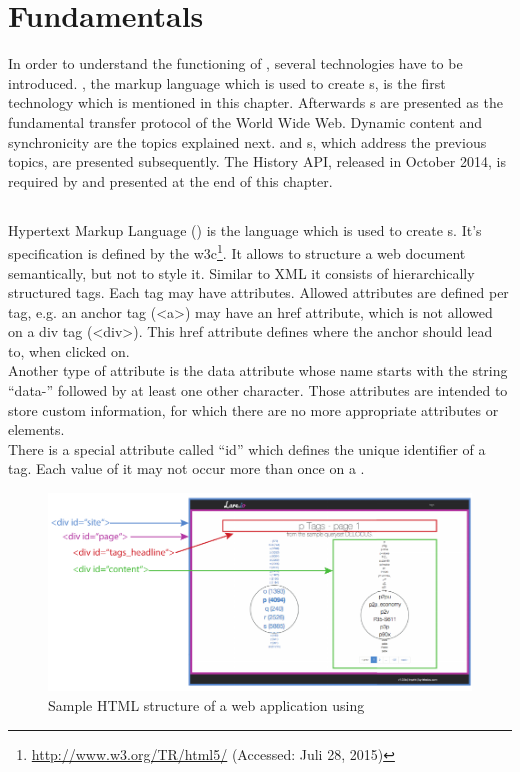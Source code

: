 \section{Fundamentals\label{chap:fundamentals}}

In order to understand the functioning of \lare{}, several technologies have to be introduced.
\html{}, the markup language which is used to create \webPage{}s, is the first technology which is mentioned in this chapter.
Afterwards \httpRequest{}s are presented as the fundamental transfer protocol of the World Wide Web.
Dynamic content and synchronicity are the topics explained next.
\ajax{} and \singlePageApplication{}s, which address the previous topics, are presented subsequently.
The History API, released in October 2014, is required by \lare{} and presented at the end of this chapter.

\subsection{\html{}\label{html}}
Hypertext Markup Language (\html{}) is the language which is used to create \webPage{}s.
It's specification is defined by the \gls{w3c}\footnote{\url{http://www.w3.org/TR/html5/} (Accessed: Juli 28, 2015)}.
It allows to structure a web document semantically, but not to style it.
Similar to XML it consists of hierarchically structured tags.
Each tag may have attributes.
Allowed attributes are defined per tag, e.g. an anchor tag (<a>) may have an href attribute, which is not allowed on a div tag (<div>).
This href attribute defines where the anchor should lead to, when clicked on.
\\
Another type of attribute is the data attribute whose name starts with the string \enquote{data-} followed by at least one other character.
Those attributes are intended to store custom information, for which there are no more appropriate attributes or elements.
\\
There is a special attribute called \enquote{id} which defines the unique identifier of a tag.
Each value of it may not occur more than once on a \webPage{}.

\begin{figure}[H]
\centering
\includegraphics[width=13cm]{images/lare_html.pdf}
\caption[lare_html]{Sample HTML structure of a web application using \lare{}}
\label{fig:lare_html}
\end{figure}

